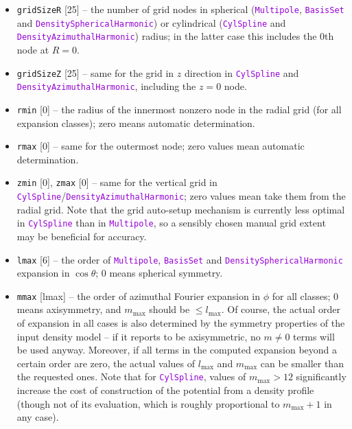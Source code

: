 \documentclass[12pt]{article}
\newcommand{\ttt}[1]{\textcolor{darkviolet}{\texttt{#1}}}
\newcommand{\ppp}[1]{\textcolor{darkolive} {\texttt{#1}}}
\begin{document}
\begin{itemize}
\item \ppp{gridSizeR} [25] -- the number of grid nodes in spherical (\ttt{Multipole}, \ttt{BasisSet} and \ttt{DensitySphericalHarmonic}) or cylindrical (\ttt{CylSpline} and \ttt{DensityAzimuthal\-Harmonic}) radius; in the latter case this includes the 0th node at $R=0$. 
\item \ppp{gridSizeZ} [25] -- same for the grid in $z$ direction in \ttt{CylSpline} and \ttt{DensityAzimuthal\-Harmonic}, including the $z=0$ node.
\item \ppp{rmin} [0] -- the radius of the innermost nonzero node in the radial grid (for all expansion classes); zero means automatic determination.
\item \ppp{rmax} [0] -- same for the outermost node; zero values mean automatic determination.
\item \ppp{zmin} [0], \ppp{zmax} [0] -- same for the vertical grid in \ttt{CylSpline}/\ttt{DensityAzimuthalHarmonic}; zero values mean take them from the radial grid. Note that the grid auto-setup mechanism is currently less optimal in \ttt{CylSpline} than in \ttt{Multipole}, so a sensibly chosen manual grid extent may be beneficial for accuracy.
\item \ppp{lmax} [6] -- the order of \ttt{Multipole}, \ttt{BasisSet} and \ttt{DensitySphericalHarmonic} expansion in $\cos\theta$; 0 means spherical symmetry. 
\item \ppp{mmax} [lmax] -- the order of azimuthal Fourier expansion in $\phi$ for all classes; 0 means axisymmetry, and $m_\mathrm{max}$ should be $\le l_\mathrm{max}$. Of course, the actual order of expansion in all cases is also determined by the symmetry properties of the input density model -- if it reports to be axisymmetric, no $m\ne 0$ terms will be used anyway. Moreover, if all terms in the computed expansion beyond a certain order are zero, the actual values of $l_\mathrm{max}$ and $m_\mathrm{max}$ can be smaller than the requested ones. Note that for \ttt{CylSpline}, values of $m_\mathrm{max}>12$ significantly increase the cost of construction of the potential from a density profile (though not of its evaluation, which is roughly proportional to $m_\mathrm{max}+1$ in any case).

\end{itemize}
\end{document}
